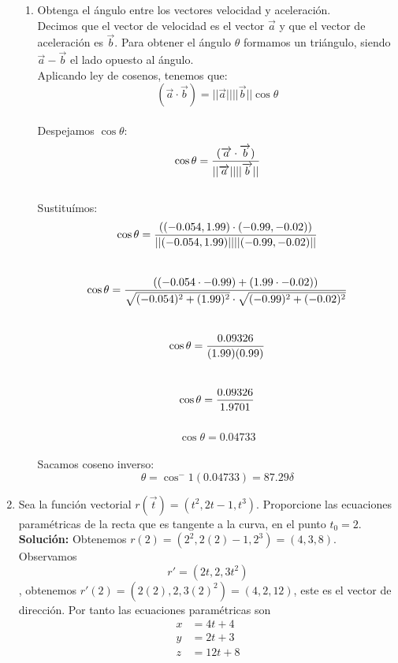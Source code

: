 \documentclass[10pt,letterpaper,fleqn]{article}
\begin{document}
\begin{enumerate}
\begin{enumerate}
            \item Obtenga el ángulo entre los vectores velocidad y aceleración.
            \\ Decimos que el vector de velocidad es el vector $\overrightarrow{a}$ y que el vector de aceleración es $\overrightarrow{b}$. Para obtener el ángulo $\theta$ formamos un triángulo, siendo $\overrightarrow{a}-\overrightarrow{b}$ el lado opuesto al ángulo.
            \\ Aplicando ley de cosenos, tenemos que: \\
            $$(\overrightarrow{a} \cdot \overrightarrow{b})=||\overrightarrow{a}|| ||\overrightarrow{b}|| \cos \theta $$ \\
            Despejamos $\cos \theta$: \\
            $$\cos \theta = {(\overrightarrow{a} \cdot \overrightarrow{b}) \over ||\overrightarrow{a}|| ||\overrightarrow{b}||}$$ \\ 
            Sustituímos: \\
            $$\cos \theta = {((-0.054,1.99) \cdot (-0.99,-0.02)) \over ||(-0.054,1.99)|| ||(-0.99,-0.02)||}$$ \\
            $$\cos \theta = {((-0.054 \cdot-0.99) + (1.99 \cdot -0.02)) \over \sqrt{(-0.054)^2 + (1.99)^2} \cdot \sqrt{(-0.99)^2 + (-0.02)^2}}$$ \\
            $$\cos \theta = {0.09326 \over (1.99)(0.99)}$$ \\
            $$\cos \theta = {0.09326 \over 1.9701}$$ \\
            $$\cos \theta = {0.04733}$$ \\
            Sacamos coseno inverso: \\
            $$\theta = \cos^-1 (0.04733) = 87.29 \delta$$

        \end{enumerate}


        \item Sea la función vectorial $r(\overrightarrow{t})=(t^2, 2t-1, t^3)$. Proporcione las ecuaciones paramétricas de
        la recta que es tangente a la curva, en el punto $t_0=2$.\\
        \textbf{Solución:} Obtenemos $r(2)= (2^2,2(2) -1 , 2^3)=(4, 3, 8)$. Observamos $$r' = (2t,2,3t^2)$$, obtenemos
        $r'(2) = (2(2),2,3(2)^2) = (4,2,12)$, este es el vector de dirección. Por tanto las ecuaciones paramétricas son
        \begin{equation*}
        \begin{split}
        	x &= 4t + 4 \\
        	y &= 2t + 3 \\
        	z &= 12t + 8
        \end{split}
        \end{equation*} 


\end{enumerate}
\end{document}
